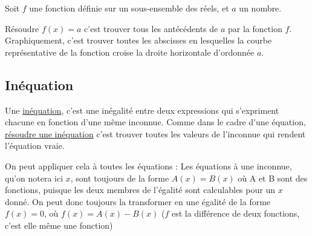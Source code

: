 \documentclass[10pt,a4paper,oneside]{book}
\begin{document}
Soit $f$ une fonction définie sur un sous-ensemble des réels, et $a$ un nombre.

\begin{minipage}{0.5\textwidth}  
Résoudre $f(x)=a$ c'est trouver tous les antécédents de $a$ par la fonction $f$.  
\newline ~ \newline
Graphiquement, c'est trouver toutes les abscisses en lesquelles la courbe représentative de la fonction croise la droite horizontale d'ordonnée $a$.
\end{minipage}
\begin{minipage}{0.35\textwidth}
\end{minipage}

\subsection{Inéquation}

\begin{de}
    Une \underline{inéquation}, c'est une inégalité entre deux expressions qui s'expriment chacune en fonction d'une même inconnue. Comme dans le cadre d'une équation, \underline{résoudre une inéquation} c'est trouver toutes les valeurs de l'inconnue qui rendent l'équation vraie.
\end{de}

On peut appliquer cela à toutes les équations : Les équations à une inconnue, qu'on notera ici $x$, sont toujours de la forme $A(x)=B(x)$ où A et B sont des fonctions, puisque les deux membres de l'égalité sont calculables pour un $x$ donné.
On peut donc toujours la transformer en une égalité de la forme $f(x)=0$, où $f(x)=A(x)-B(x)$  ($f$ est la différence de deux fonctions, c'est elle même une fonction)
\end{document}
